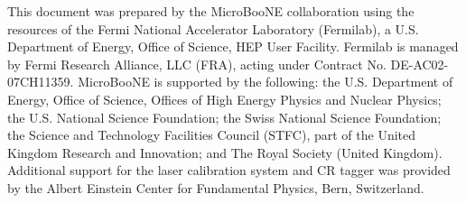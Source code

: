 \documentclass[%
twocolumn,
superscriptaddress,
showpacs,preprintnumbers,
amsmath,amssymb,
aps,
prl,
longbibliography
]{revtex4-1}
\begin{document}
This document was prepared by the MicroBooNE collaboration using the
resources of the Fermi National Accelerator Laboratory (Fermilab), a
U.S. Department of Energy, Office of Science, HEP User Facility.
Fermilab is managed by Fermi Research Alliance, LLC (FRA), acting
under Contract No. DE-AC02-07CH11359.  MicroBooNE is supported by the
following: the U.S. Department of Energy, Office of Science, Offices
of High Energy Physics and Nuclear Physics; the U.S. National Science
Foundation; the Swiss National Science Foundation; the Science and
Technology Facilities Council (STFC), part of the United Kingdom Research and Innovation; and The Royal Society (United Kingdom).  Additional support for the laser calibration system and CR tagger was provided by the Albert Einstein Center for Fundamental Physics, Bern, Switzerland.


\end{document}
